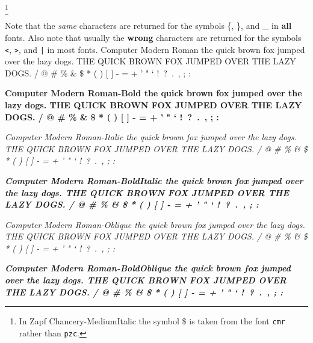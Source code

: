 \documentclass{article}
\begin{document}
\footnote{In Zapf Chancery-MediumItalic the symbol \$ is taken from the font
  \texttt{cmr} rather than \texttt{pzc}.}
\par
\noindent
Note that the \emph{same} characters are returned for the symbols \{, \}, and
\_ in \textbf{all} fonts.  Also note that usually the \textbf{wrong}
characters are returned for the symbols \verb+<+, \verb+>+, and \verb+|+ in
most fonts.
\newpage
Computer Modern Roman \newline
the quick brown fox jumped over the lazy dogs. \newline
THE QUICK BROWN FOX JUMPED OVER THE LAZY DOGS.  / @ \# \% \& \$ * ( ) [ ] - = + ' " ` !\ ?\ .\ , ; : \par
{\bfseries
Computer Modern Roman-Bold \newline
the quick brown fox jumped over the lazy dogs. \newline
THE QUICK BROWN FOX JUMPED OVER THE LAZY DOGS.  / @ \# \% \& \$ * ( ) [ ] - = + ' " ` !\ ?\ .\ , ; : }\par
{\itshape
Computer Modern Roman-Italic \newline
the quick brown fox jumped over the lazy dogs. \newline
THE QUICK BROWN FOX JUMPED OVER THE LAZY DOGS.  / @ \# \% \& \$ * ( ) [ ] - = + ' " ` !\ ?\ .\ , ; : }\par
{\bfseries \itshape
Computer Modern Roman-BoldItalic \newline
the quick brown fox jumped over the lazy dogs. \newline
THE QUICK BROWN FOX JUMPED OVER THE LAZY DOGS.  / @ \# \% \& \$ * ( ) [ ] - = + ' " ` !\ ?\ .\ , ; : }\par
{\slshape
Computer Modern Roman-Oblique \newline
the quick brown fox jumped over the lazy dogs. \newline
THE QUICK BROWN FOX JUMPED OVER THE LAZY DOGS.  / @ \# \% \& \$ * ( ) [ ] - = + ' " ` !\ ?\ .\ , ; : } \par
{\bfseries \slshape
Computer Modern Roman-BoldOblique \newline
the quick brown fox jumped over the lazy dogs. \newline
THE QUICK BROWN FOX JUMPED OVER THE LAZY DOGS.  / @ \# \% \& \$ * ( ) [ ] - = + ' " ` !\ ?\ .\ , ; : }\par
\end{document}
